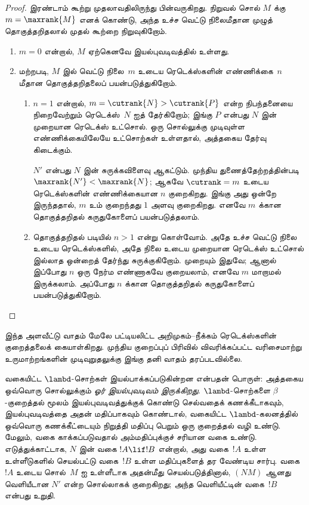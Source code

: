 \documentclass[../../../include/open-logic-section]{subfiles}
\begin{document}
\begin{proof}
  இரண்டாம் கூற்று முதலாவதிலிருந்து பின்வருகிறது.
  நிறுவல் சொல் $M$ க்கு $m=\maxrank{M}$ எனக் கொண்டு,
  அந்த உச்ச வெட்டு நிலைமீதான முழுத் தொகுத்தறிதலால் முதல் கூற்றை
  நிறுவுகிறோம்.
  \begin{enumerate}

  \item $m=0$ என்றால், $M$ ஏற்கெனவே இயல்புவடிவத்தில் உள்ளது.
  \item மற்றபடி, $M$ இல் வெட்டு நிலை~$m$ உடைய
    ரெடெக்ஸ்களின் எண்ணிக்கை~$n$ மீதான தொகுத்தறிதலைப்
    பயன்படுத்துகிறோம்.
    \begin{enumerate}
    \item $n=1$ என்றால், $m = \cutrank{N} >
      \cutrank{P}$ என்ற நிபந்தனையை நிறைவேற்றும்
      ரெடெக்ஸ்~$N$ ஐத் தேர்கிறோம்; இங்கு $P$ என்பது
      $N$ இன் முறையான ரெடெக்ஸ் உட்சொல். ஒரு சொல்லுக்கு
      முடிவுள்ள எண்ணிக்கையிலேயே உட்சொற்கள் உள்ளதால்,
      அத்தகைய தேர்வு கிடைக்கும்.

      $N'$ என்பது $N$ இன் சுருக்கவிளைவு ஆகட்டும்.
      முந்திய துணைத்தேற்றத்தின்படி
      $\maxrank{N'} < \maxrank{N}$; ஆகவே
      $\cutrank=m$ உடைய ரெடெக்ஸ்களின் எண்ணிக்கையான
      $n$ குறைகிறது. இங்கு அது ஒன்றே இருந்ததால்,
      $m$ உம் குறைந்தது $1$ அளவு குறைகிறது.
      எனவே $m$ க்கான தொகுத்தறிதல் கருதுகோளைப்
      பயன்படுத்தலாம்.
    \item தொகுத்தறிதல் படியில் $n>1$ என்று கொள்வோம்.
      அதே உச்ச வெட்டு நிலை உடைய ரெடெக்ஸ்களில், அதே
      நிலை உடைய முறையான ரெடெக்ஸ் உட்சொல் இல்லாத
      ஒன்றைத் தேர்ந்து சுருக்குகிறோம். முறையும் இதுவே;
      ஆனால் இப்போது $n$ ஒரு நேர்ம எண்ணாகவே குறையலாம்,
      எனவே $m$ மாறாமல் இருக்கலாம். அப்போது $n$
      க்கான தொகுத்தறிதல் கருதுகோளைப் பயன்படுத்துகிறோம்.
    \end{enumerate}
  \end{enumerate}
\end{proof}

இந்த அளவீட்டு வாதம் மேலே பட்டியலிட்ட அறிமுகம்--நீக்கம்
ரெடெக்ஸ்களின் குறைத்தலைக் கையாள்கிறது. முந்திய
குறைப்புப் பிரிவில் விவரிக்கப்பட்ட வரிசைமாற்று
உருமாற்றங்களின் முடிவுறுதலுக்கு இங்கு தனி வாதம் தரப்படவில்லை.

வகையிட்ட $\lambd$-சொற்கள் இயல்பாக்கப்படுகின்றன
என்பதன் பொருள்: அத்தகைய ஒவ்வொரு சொல்லுக்கும்
\emph{ஓர் இயல்புவடிவம் இருக்கிறது}. $\lambd$-சொற்களை
$\beta$-குறைத்தல் மூலம் இயல்புவடிவத்துக்குக் கொண்டு
செல்வதைக் கணக்கீடாகவும், இயல்புவடிவத்தை அதன்
மதிப்பாகவும் கொண்டால், வகையிட்ட $\lambd$-கலனத்தில்
ஒவ்வொரு கணக்கீட்டையும் நிறுத்தி மதிப்பு பெறும் ஒரு
குறைத்தல் வழி உண்டு. மேலும், வகை காக்கப்படுவதால்
அம்மதிப்புக்குச் சரியான வகை உண்டு. எடுத்துக்காட்டாக,
$N$ இன் வகை $!A \lif !B$ என்றால், அது வகை~$!A$
உள்ள உள்ளீடுகளில் செயல்பட்டு வகை~$!B$ உள்ள மதிப்புகளைத்
தர வேண்டிய சார்பு. வகை~$!A$ உடைய சொல்~$M$ ஐ
உள்ளீடாக அதன்மீது செயல்படுத்தினால், $(NM)$ ஆனது
வெளியீடான $N'$ என்ற சொல்லாகக் குறைகிறது; அந்த
வெளியீட்டின் வகை~$!B$ என்பது உறுதி.
\end{document}
